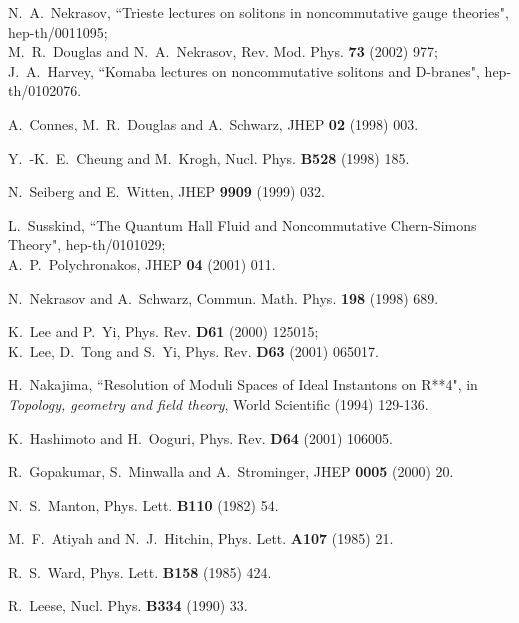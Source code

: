 \documentclass[a4paper,12pt]{article}
\begin{document}



\begin{thebibliography}{99}

N.~A.~Nekrasov,
``Trieste lectures on solitons in noncommutative gauge theories",
hep-th/0011095; \\
M.~R.~Douglas and N.~A.~Nekrasov,
Rev. Mod. Phys. {\bf 73} (2002) 977; \\
J.~A.~Harvey,
``Komaba lectures on noncommutative solitons and D-branes",
hep-th/0102076.

A.~Connes, M.~R.~Douglas and A.~Schwarz, JHEP {\bf 02} (1998) 003.

Y.~-K.~E.~Cheung and M.~Krogh, Nucl. Phys. {\bf B528} (1998) 185.

N.~Seiberg and E.~Witten, JHEP {\bf 9909} (1999) 032.

L.~Susskind, ``The Quantum Hall Fluid and Noncommutative Chern-Simons Theory", 
hep-th/0101029; \\
A.~P.~Polychronakos, JHEP {\bf 04} (2001) 011.  

N.~Nekrasov and A.~Schwarz, Commun. Math. Phys. {\bf 198} (1998) 689.

K.~Lee and P.~Yi, Phys. Rev. {\bf D61} (2000) 125015; \\
K.~Lee, D.~Tong and S.~Yi, Phys. Rev. {\bf D63} (2001) 065017.

H.~Nakajima, ``Resolution of Moduli Spaces of Ideal Instantons on R**4",
in {\it Topology, geometry and field theory}, World Scientific (1994) 129-136.

K.~Hashimoto and H.~Ooguri, Phys. Rev. {\bf D64} (2001) 106005.
\fi

R.~Gopakumar, S.~Minwalla and A.~Strominger, JHEP {\bf 0005} (2000) 20.

N.~S.~Manton,
Phys. Lett. {\bf B110} (1982) 54.

M.~F.~Atiyah and N.~J.~Hitchin,
Phys. Lett. {\bf A107} (1985) 21.

R.~S.~Ward, Phys. Lett. {\bf B158} (1985) 424.

R.~Leese, Nucl. Phys. {\bf B334} (1990) 33.


\end{thebibliography}
\end{document}

